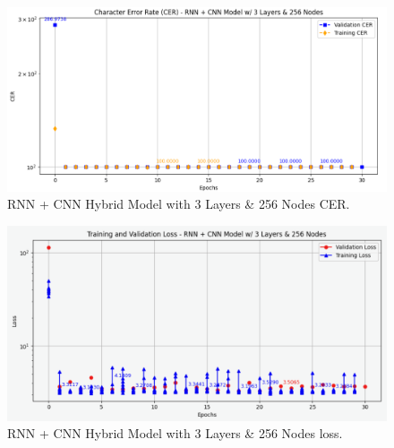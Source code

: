 \documentclass{article}
\begin{document}
\begin{figure}[ht]

  \centering
  \includegraphics[width=0.8\linewidth]{Hybrid_3_256_CER.png} 
  \caption{RNN + CNN Hybrid Model with 3 Layers \& 256 Nodes CER.}
  \label{fig:Hybrid_3_256_cer}

\end{figure}

\begin{figure}[ht]

  \centering
  \includegraphics[width=0.8\linewidth]{Hybrid_3_256_loss.png} 
  \caption{RNN + CNN Hybrid Model with 3 Layers \& 256 Nodes loss.}
  \label{fig:Hybrid_3_256_loss}

\end{figure}
\end{document}
